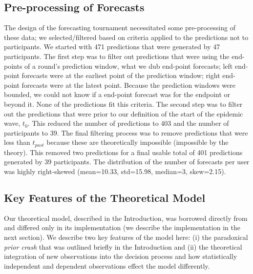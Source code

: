 \subsection{Pre-processing of Forecasts}
The design of the forecasting tournament necessitated some pre-processing of these data; we selected/filtered based on criteria applied to the predictions not to participants. We started with 471 predictions that were generated by 47 participants.  The first step was to filter out predictions that were using the end-points of a round's prediction window, what we dub end-point forecasts; left end-point forecasts were at the earliest point of the prediction window; right end-point forecasts were at the latest point.  Because the prediction windows were bounded, we could not know if a end-point forecast was for the endpoint or beyond it.  None of the predictions fit this criteria.  The second step was to filter out the predictions that were prior to our definition of the start of the epidemic wave, $t_0$.  This reduced the number of predictions to 403 and the number of participants to 39.  The final filtering process was to remove predictions that were less than $t_{past}$ because these are theoretically impossible (impossible by the theory).  This removed two predictions for a final usable total of 401 predictions generated by 39 participants.  The distribution of the number of forecasts per user was highly right-skewed (mean=10.33, std=15.98, median=3, skew=2.15).

\subsection{Key Features of the Theoretical Model}
Our theoretical model, described in the Introduction, was borrowed directly from \citep{GriffithsTenenbaum2006} and differed only in its implementation (we describe the implementation in the next section).  We describe two key features of the model here: (i) the paradoxical \textit{prior crash} that was outlined briefly in the Introduction and (ii) the theoretical integration of new observations into the decision process and how statistically independent and dependent observations effect the model differently.  


